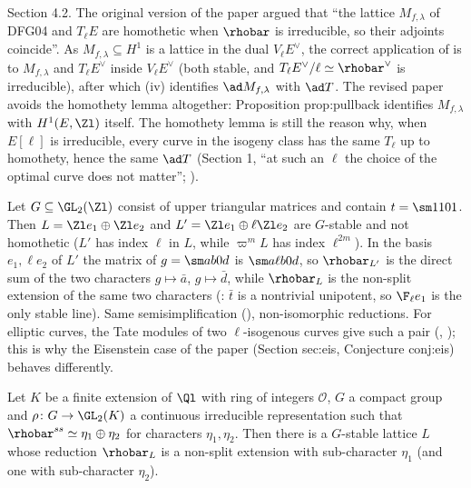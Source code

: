 \begin{paperlink}
Section 4.2. The original version of the paper argued that ``the lattice $M_{f,\lambda}$ of DFG04 and $T_\ell E$ are homothetic when $\rhobar$ is
irreducible, so their adjoints coincide''. As $M_{f,\lambda}\subseteq H^1$ is a lattice in the dual $V_\ell E^\vee$, the correct application of
 is to $M_{f,\lambda}$ and $T_\ell E^\vee$ inside $V_\ell E^\vee$ (both stable, and $T_\ell E^\vee/\ell\simeq\rhobar^\vee$ is irreducible), after which
(iv) identifies $\ad M_{f,\lambda}$ with $\ad T$. The revised paper avoids the homothety lemma altogether: Proposition
prop:pullback identifies $M_{f,\lambda}$ with $H^1(E,\Zl)$ itself. The homothety lemma is still the reason why, when $E[\ell]$ is irreducible, every curve
in the isogeny class has the same $T_\ell$ up to homothety, hence the same $\ad T$ (Section 1, ``at such an $\ell$ the choice of the optimal curve does
not matter''; ).
\end{paperlink}

\begin{example}\label{ex:reps:nonhomothetic}
Let $G\subseteq\GL_2(\Zl)$ consist of upper triangular matrices and contain $t=\sm1101$. Then $L=\Zl e_1\oplus\Zl e_2$ and $L'=\Zl e_1\oplus\ell\Zl e_2$ are $G$-stable and
not homothetic ($L'$ has index $\ell$ in $L$, while $\varpi^mL$ has index $\ell^{2m}$). In the basis $e_1,\ell e_2$ of $L'$ the matrix of $g=\sm ab0d$ is $\sm a{\ell b}0d$, so
$\rhobar_{L'}$ is the direct sum of the two characters $g\mapsto\bar a$, $g\mapsto\bar d$, while $\rhobar_L$ is the non-split extension of the same two characters
(: $\bar t$ is a nontrivial unipotent, so $\F_\ell e_1$ is the only stable line). Same semisimplification
(), non-isomorphic reductions. For elliptic curves, the Tate modules of two $\ell$-isogenous curves give such a pair
(, ); this is why the Eisenstein case of the paper (Section sec:eis, Conjecture conj:eis) behaves
differently.
\end{example}

\begin{theorem}\label{thm:reps:ribet}
Let $K$ be a finite extension of $\Ql$ with ring of integers $\mathcal{O}$, $G$ a compact group and $\rho\colon G\to\GL_2(K)$ a continuous irreducible
representation such that $\rhobar^{ss}\simeq\eta_1\oplus\eta_2$ for characters $\eta_1,\eta_2$. Then there is a $G$-stable lattice $L$ whose reduction $\rhobar_L$ is a non-split
extension with sub-character $\eta_1$ (and one with sub-character $\eta_2$).
\end{theorem}

